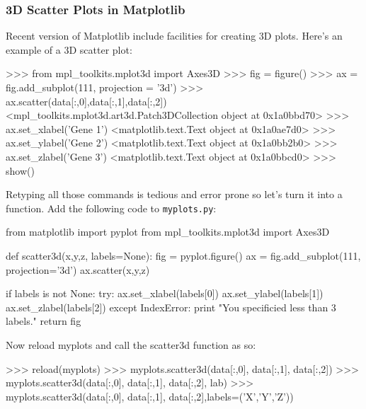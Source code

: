 \subsubsection{3D Scatter Plots in Matplotlib}

Recent version of Matplotlib include facilities for creating 3D plots.
Here's an example of a 3D scatter plot:

\begin{python}
>>> from mpl_toolkits.mplot3d import Axes3D
>>> fig = figure()
>>> ax = fig.add_subplot(111, projection = '3d')
>>> ax.scatter(data[:,0],data[:,1],data[:,2])
<mpl_toolkits.mplot3d.art3d.Patch3DCollection object at 0x1a0bbd70>
>>> ax.set_xlabel('Gene 1')
<matplotlib.text.Text object at 0x1a0ae7d0>
>>> ax.set_ylabel('Gene 2')
<matplotlib.text.Text object at 0x1a0bb2b0>
>>> ax.set_zlabel('Gene 3')
<matplotlib.text.Text object at 0x1a0bbcd0>
>>> show()
\end{python}
%
Retyping all those commands is tedious and error prone so let's turn it
into a function. Add the following code to \lstinline!myplots.py!:

\begin{python}
from matplotlib import pyplot
from mpl_toolkits.mplot3d import Axes3D

def scatter3d(x,y,z, labels=None):
    fig = pyplot.figure()
    ax = fig.add_subplot(111, projection='3d')
    ax.scatter(x,y,z)

    if labels is not None:
        try:
            ax.set_xlabel(labels[0])
            ax.set_ylabel(labels[1])
            ax.set_zlabel(labels[2])
        except IndexError:
            print "You specificied less than 3 labels."
    return fig
\end{python}
Now reload myplots and call the scatter3d function as so:

\begin{python}
>>> reload(myplots)
>>> myplots.scatter3d(data[:,0], data[:,1], data[:,2])
>>> myplots.scatter3d(data[:,0], data[:,1], data[:,2], lab)
>>> myplots.scatter3d(data[:,0], data[:,1], data[:,2],labels=('X','Y','Z'))
\end{python}

